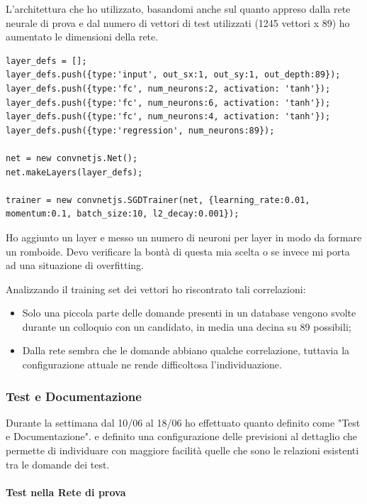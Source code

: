 L'architettura che ho utilizzato, basandomi anche sul quanto appreso dalla rete neurale di prova e dal numero di vettori di test utilizzati (1245 vettori x 89) ho aumentato le dimensioni della rete.
\begin{verbatim}
layer_defs = [];
layer_defs.push({type:'input', out_sx:1, out_sy:1, out_depth:89});
layer_defs.push({type:'fc', num_neurons:2, activation: 'tanh'});
layer_defs.push({type:'fc', num_neurons:6, activation: 'tanh'});
layer_defs.push({type:'fc', num_neurons:4, activation: 'tanh'});
layer_defs.push({type:'regression', num_neurons:89});

net = new convnetjs.Net();
net.makeLayers(layer_defs);

trainer = new convnetjs.SGDTrainer(net, {learning_rate:0.01,
momentum:0.1, batch_size:10, l2_decay:0.001});
\end{verbatim}
Ho aggiunto un layer e messo un numero di neuroni per layer in modo da formare un romboide. Devo verificare la bont\`a di questa mia scelta o se invece mi porta ad una situazione di overfitting.


Analizzando il training set dei vettori ho riscontrato tali correlazioni:
\begin{itemize}
\item Solo una piccola parte delle domande presenti in un database vengono svolte durante un colloquio con un candidato, in media una decina su 89 possibili;
\item Dalla rete sembra che le domande abbiano qualche correlazione, tuttavia la configurazione attuale ne rende difficoltosa l'individuazione.
\end{itemize}

\subsubsection{Test e Documentazione}
\label{Test e Documentazione}
Durante la settimana dal 10/06 al 18/06 ho effettuato quanto definito come "Test e Documentazione".
e definito una configurazione delle previsioni al dettaglio che permette di individuare con maggiore facilit\`a quelle che sono le relazioni esistenti tra le domande dei test.

\paragraph{Test nella Rete di prova}\mbox{}\\\\
\label{Test nella Rete di prova}
\noindent

